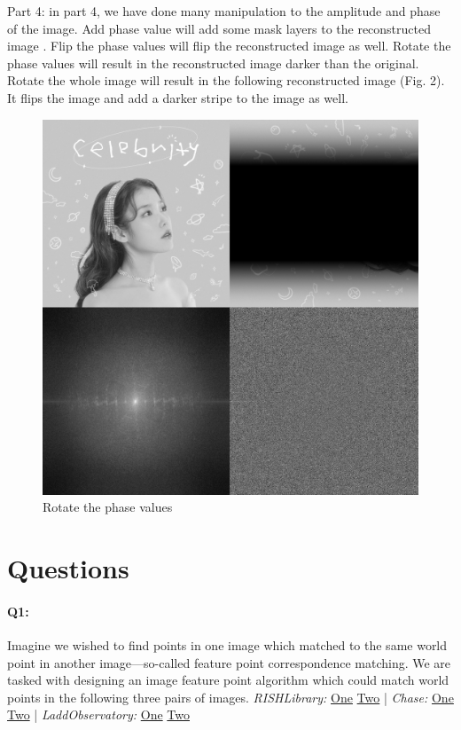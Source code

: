 Part 4: in part 4, we have done many manipulation to the amplitude and phase of the image. Add phase value will add some mask layers to the reconstructed image . Flip the phase values will flip the reconstructed image as well. Rotate the phase values will result in the reconstructed image darker than the original. Rotate the whole image will result in the following reconstructed image (Fig. 2). It flips the image and add a darker stripe to the image as well.

\begin{figure}[htbp]
    \centering
    \includegraphics[width=0.5\linewidth]{Part4_rotate_whole_image.png}
    \caption{Rotate the phase values}
\end{figure}





\pagebreak
\section*{Questions}

\paragraph{Q1:} Imagine we wished to find points in one image which matched to the same world point in another image---so-called feature point correspondence matching. We are tasked with designing an image feature point algorithm which could match world points in the following three pairs of images.
\newline
\newline
\emph{RISHLibrary:} \href{RISHLibrary1.jpg}{One} \href{RISHLibrary2.jpg}{Two} | \emph{Chase:} \href{Chase1.jpg}{One} \href{Chase2.jpg}{Two} | \emph{LaddObservatory:} \href{LaddObservatory1.jpg}{One} \href{LaddObservatory2.jpg}{Two}

